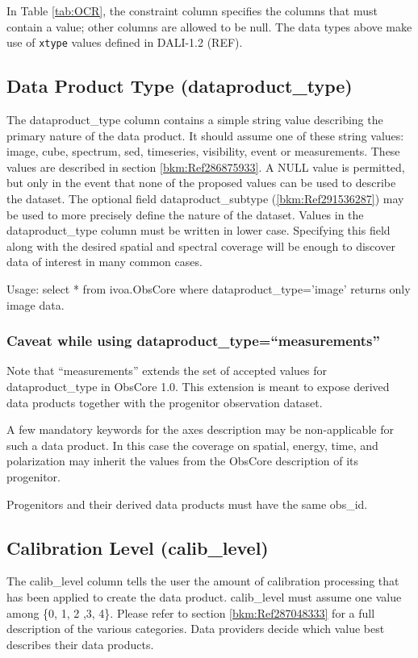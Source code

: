 \documentclass[11pt,a4paper]{ivoa}
\begin{document}
In Table \ref{tab:OCR}, the constraint column specifies the columns that must contain a value; other columns are allowed
to be null. The data types above make use of \verb|xtype| values defined in DALI-1.2 (REF).

\subsection{Data Product Type (dataproduct\_type)}
The dataproduct\_type column contains a simple string value describing the primary nature of the data product.  It
should assume one of these string values: image, cube, spectrum, sed, timeseries, visibility, event or measurements.
These values are described in section \ref{bkm:Ref286875933}.  A NULL value is permitted, but only in the event that
none of the proposed values can be used to describe the dataset.  The optional field dataproduct\_subtype
(\ref{bkm:Ref291536287}) may be used to more precisely define the nature of the dataset.  Values in the
dataproduct\_type column must be written in lower case. Specifying this field along with the desired spatial and
spectral coverage will be enough to discover data of interest in many common cases.

Usage: select * from ivoa.ObsCore where dataproduct\_type='image' returns only image data.

\subsubsection{Caveat while using dataproduct\_type=``measurements''}
Note that ``measurements'' extends the set of accepted values for dataproduct\_type in ObsCore 1.0. This extension is
meant to expose derived data products together with the progenitor observation dataset.

A few mandatory keywords for the axes description may be non-applicable for such a data product. In this case the
coverage on spatial, energy, time, and polarization may inherit the values from the ObsCore description of its
progenitor.

Progenitors and their derived data products must have the same obs\_id.

\subsection{Calibration Level (calib\_level)}
The calib\_level column tells the user the amount of calibration processing that has been applied to create the data
product. calib\_level must assume one value among \{0, 1, 2 ,3, 4\}. Please refer to section \ref{bkm:Ref287048333} for
a full description of the various categories.  Data providers decide which value best describes their data products.
\end{document}
